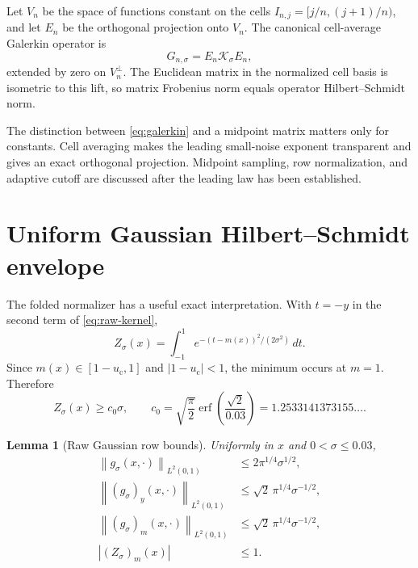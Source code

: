 \documentclass[11pt]{article}
\newtheorem{lemma}[theorem]{Lemma}
\theoremstyle{definition}
\theoremstyle{remark}
\newcommand{\cK}{\mathcal K}
\newcommand{\uc}{u_{\mathrm c}}
\newcommand{\norm}[1]{\left\lVert #1\right\rVert}
\begin{document}
Let $V_n$ be the space of functions constant on the cells
$I_{n,j}=[j/n,(j+1)/n)$, and let $E_n$ be the orthogonal projection onto
$V_n$.  The canonical cell-average Galerkin operator is
\begin{equation}
 G_{n,\sigma}=E_n\cK_\sigma E_n,
 \label{eq:galerkin}
\end{equation}
extended by zero on $V_n^\perp$.  The Euclidean matrix in the normalized
cell basis is isometric to this lift, so matrix Frobenius norm equals
operator Hilbert--Schmidt norm.

The distinction between \eqref{eq:galerkin} and a midpoint matrix matters
only for constants.  Cell averaging makes the leading small-noise exponent
transparent and gives an exact orthogonal projection.  Midpoint sampling,
row normalization, and adaptive cutoff are discussed after the leading law
has been established.

\section{Uniform Gaussian Hilbert--Schmidt envelope}
\label{sec:envelope}

The folded normalizer has a useful exact interpretation.  With $t=-y$ in
the second term of \eqref{eq:raw-kernel},
\begin{equation}
 Z_\sigma(x)
 =\int_{-1}^{1}
 e^{-(t-m(x))^2/(2\sigma^2)}\,dt.
 \label{eq:normalizer-unfolded}
\end{equation}
Since $m(x)\in[1-\uc,1]$ and $|1-\uc|<1$, the minimum occurs at
$m=1$.  Therefore
\begin{equation}
 Z_\sigma(x)
 \ge c_0\sigma,
 \qquad
 c_0=\sqrt{\frac\pi2}
 \operatorname{erf}\!\left(\frac{\sqrt2}{0.03}\right)
 =1.2533141373155\ldots.
 \label{eq:normalizer-lower}
\end{equation}

\begin{lemma}[Raw Gaussian row bounds]
\label{lem:raw-bounds}
Uniformly in $x$ and $0<\sigma\le0.03$,
\begin{align}
 \norm{g_\sigma(x,\cdot)}_{L^2(0,1)}
 &\le2\pi^{1/4}\sigma^{1/2},
 \label{eq:raw-L2}\\
 \norm{(g_\sigma)_y(x,\cdot)}_{L^2(0,1)}
 &\le\sqrt2\,\pi^{1/4}\sigma^{-1/2},
 \label{eq:raw-y}\\
 \norm{(g_\sigma)_m(x,\cdot)}_{L^2(0,1)}
 &\le\sqrt2\,\pi^{1/4}\sigma^{-1/2},
 \label{eq:raw-m}\\
 |(Z_\sigma)_m(x)|&\le1.
 \label{eq:Z-m}
\end{align}
\end{lemma}
\end{document}
